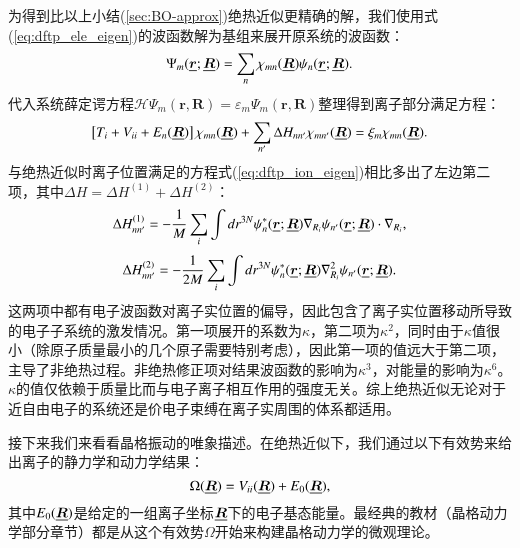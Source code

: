 为得到比以上小结(\ref{sec:BO-approx})绝热近似更精确的解，我们使用式(\ref{eq:dftp_ele_eigen})的波函数解为基组来展开原系统的波函数：
\begin{equation}
  \Psi_m(\underline{\bm{r}};\underline{\bm{R}}) = \sum_n \chi_{mn}(\underline{\bm{R}})\psi_n(\underline{\bm{r}};\underline{\bm{R}}).
\end{equation}
代入系统薛定谔方程$\mathcal{H} \Psi_m(\bm{r},\bm{R})=\mathcal{\varepsilon}_m \Psi_m(\bm{r},\bm{R})$整理得到离子部分满足方程：
\begin{equation}
  \left[ T_i + V_{ii} + E_n(\underline{\bm{R}}) \right] \chi_{mn}(\underline{\bm{R}}) + \sum_{n'}\Delta H_{nn'}\chi_{mn'}(\underline{\bm{R}}) = \xi_m \chi_{mn} (\underline{\bm{R}}).
\end{equation}
与绝热近似时离子位置满足的方程式(\ref{eq:dftp_ion_eigen})相比多出了左边第二项，其中$\Delta H=\Delta H^{(1)} + \Delta H^{(2)}$：
\begin{equation}
  \Delta H_{nn'}^{(1)} = -\frac{1}{M}\sum_i \int dr^{3N}\psi_n^*(\underline{\bm{r}};\underline{\bm{R}})\nabla_{R_i}\psi_{n'}(\underline{\bm{r}};\underline{\bm{R}})\cdot \nabla_{R_i},
\end{equation}
\begin{equation}
  \Delta H_{nn'}^{(2)} = -\frac{1}{2M}\sum_i \int dr^{3N}\psi_n^*(\underline{\bm{r}};\underline{\bm{R}})\nabla^2_{R_i}\psi_{n'}(\underline{\bm{r}};\underline{\bm{R}}).
\end{equation}
这两项中都有电子波函数对离子实位置的偏导，因此包含了离子实位置移动所导致的电子子系统的激发情况。第一项展开的系数为$\kappa$，第二项为$\kappa^2$，同时由于$\kappa$值很小（除原子质量最小的几个原子需要特别考虑），因此第一项的值远大于第二项，主导了非绝热过程。非绝热修正项对结果波函数的影响为$\kappa^3$，对能量的影响为$\kappa^6$。$\kappa$的值仅依赖于质量比而与电子离子相互作用的强度无关。综上绝热近似无论对于近自由电子的系统还是价电子束缚在离子实周围的体系都适用。

接下来我们来看看晶格振动的唯象描述。在绝热近似下，我们通过以下有效势来给出离子的静力学和动力学结果：
\begin{equation}\label{eq:effective_potential}
  \Omega(\underline{\bm{R}}) = V_{ii}(\underline{\bm{R}}) + E_0(\underline{\bm{R}}),
\end{equation}
其中$E_0(\underline{\bm{R}})$是给定的一组离子坐标$\underline{\bm{R}}$下的电子基态能量。最经典的教材\cite{born1954dynamical,bottger1983principles}（晶格动力学部分章节）都是从这个有效势$\Omega$开始来构建晶格动力学的微观理论。

